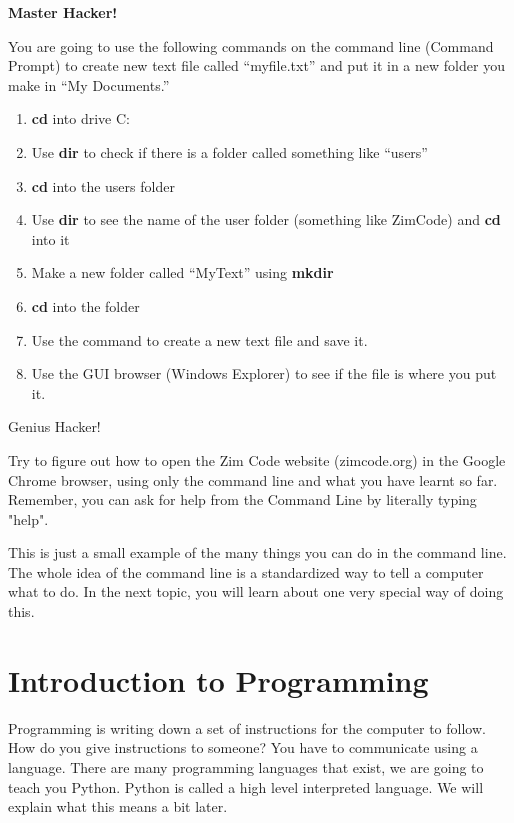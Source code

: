 \begin{exercise}\textbf{Master Hacker!}

You are going to use the following commands on the command line (Command Prompt) to create new text file called “myfile.txt” and 
put it in a new folder you make in “My Documents.”

\begin{enumerate}
\item \textbf{cd} into drive C:
\item Use \textbf{dir} to check if there is a folder called something like “users”
\item \textbf{cd} into the users folder
\item Use \textbf{dir} to see the name of the user folder (something like ZimCode) and \textbf{cd} into it
\item Make a new folder called “MyText” using \textbf{mkdir}
\item \textbf{cd} into the folder
\item Use the command  to create a new text file and save it.
\item Use the GUI browser (Windows Explorer) to see if the file is where you put it.
\end{enumerate}

\end{exercise}

\begin{exercise} Genius Hacker!

Try to figure out how to open the Zim Code website (zimcode.org) in the Google Chrome browser, using only the command line and what you have learnt so far. Remember, you can ask for help from the Command Line by literally typing "help".
\end{exercise}

This is just a small example of the many things you can do in the command line. The whole idea of the command line is a standardized way to tell a computer what to do. In the next topic, you will learn about one very special way of doing this. 


\section{Introduction to Programming}
Programming is writing down a set of instructions for the computer to follow. How do you give instructions to someone? You have to communicate using a language. There are many programming languages that exist, we are going to teach you Python. Python is called a high level interpreted language. We will explain what this means a bit later.

